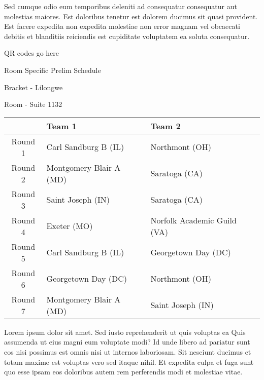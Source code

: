 \documentclass{article}%
\begin{document}
\newline%
Sed cumque odio eum temporibus deleniti ad consequatur consequatur aut molestias maiores. Est doloribus tenetur est dolorem ducimus sit quasi provident. Est facere expedita non expedita molestiae non error magnam vel obcaecati debitis et blanditiis reiciendis est cupiditate voluptatem ea soluta consequatur.%
\vspace*{140pt}%
\begin{center}%
\begin{Huge}%
QR codes go here%
\end{Huge}%
\end{center}%
\newpage%
\begin{center}%
\begin{Huge}%
Room Specific Prelim Schedule%
\end{Huge}%
\vspace*{8pt}%
\linebreak%
\begin{Large}%
Bracket {-} Lilongwe%
\end{Large}%
\vspace*{8pt}%
\linebreak%
\vspace*{8pt}%
\begin{Large}%
Room {-} Suite 1132%
\end{Large}%
\end{center}%
%
\begin{tabularx}{\textwidth}{|c|Y|Y|}%
\hline%
&Team 1&Team 2\\%
\hline%
Round 1&Carl Sandburg B (IL)&Northmont (OH)\\%
Round 2&Montgomery Blair A (MD)&Saratoga (CA)\\%
Round 3&Saint Joseph (IN)&Saratoga (CA)\\%
Round 4&Exeter (MO)&Norfolk Academic Guild (VA)\\%
Round 5&Carl Sandburg B (IL)&Georgetown Day (DC)\\%
Round 6&Georgetown Day (DC)&Northmont (OH)\\%
Round 7&Montgomery Blair A (MD)&Saint Joseph (IN)\\%
\hline%
\end{tabularx}%
\vspace*{8pt}%
\newline%
Lorem ipsum dolor sit amet. Sed iusto reprehenderit ut quis voluptas ea Quis assumenda ut eius magni eum voluptate modi? Id unde libero ad pariatur sunt eos nisi possimus est omnis nisi ut internos laboriosam. Sit nesciunt ducimus et totam maxime est voluptas vero sed itaque nihil. Et expedita culpa et fuga sunt quo esse ipsam eos doloribus autem rem perferendis modi et molestiae vitae.\newline%
\end{document}
